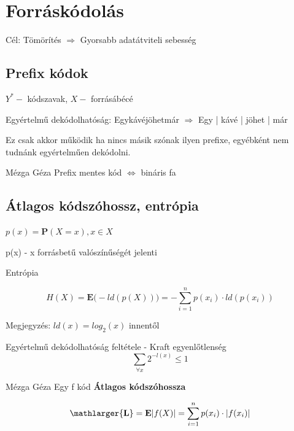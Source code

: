 
\section{Forráskódolás}
Cél: Tömörítés $\Longrightarrow$ Gyorsabb adatátviteli sebesség

\subsection{Prefix kódok}

$Y^* -$ kódszavak, $X -$ forrásábécé

Egyértelmű dekódolhatóság: Egykávéjöhetmár $\Longrightarrow$ Egy | kávé | jöhet | már

Ez csak akkor működik ha nincs másik szónak ilyen prefixe, egyébként nem tudnánk egyértelműen dekódolni.\\[-2pt]

\begin{definicio}{Mézga Géza} Prefix mentes kód $\Longleftrightarrow$ bináris fa\\[0pt]
\end{definicio}

\subsection{Átlagos kódszóhossz, entrópia}

$p(x) = \mathbf{P}(X = x), x \in X$

p(x) - x forrásbetű valószínűségét jelenti\\[-2pt]


\begin{definicio}{Entrópia}

$$H(X) = \mathbf{E}\Big(-ld(p(X))\Big) = - \sum\limits_{i = 1}^n p(x_i)\cdot ld\left(p(x_i)\right)$$

\small Megjegyzés: $ld(x) = log_2(x)$ innentől \normalsize\\[2pt]
\end{definicio}

\begin{tetel}{Egyértelmű dekódolhatóság feltétele - Kraft egyenlőtlenség}
$$ \sum\limits_{\forall x} 2^{-l(x)} \leq 1$$
\end{tetel}

\begin{definicio}{Mézga Géza} Egy f kód \textbf{Átlagos kódszóhossza}

$$ \mathlarger{\mathbf{L}} = \mathbf{E}|f(X)| = \sum\limits_{i = 1}^n p(x_i)\cdot |f(x_i)| $$
\end{definicio}

